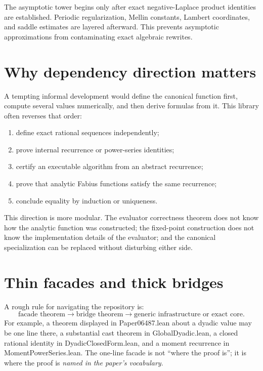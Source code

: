 \documentclass[11pt,a4paper,openany]{book}
\def\module#1{#1.lean}
\newcommand{\module}[1]{\nolinkurl{#1.lean}}
\begin{document}
\begin{dependency}[title={Seam 3: exact products to asymptotics}]
The asymptotic tower begins only after exact negative-Laplace product identities
are established.  Periodic regularization, Mellin constants, Lambert
coordinates, and saddle estimates are layered afterward.  This prevents
asymptotic approximations from contaminating exact algebraic rewrites.
\end{dependency}

\section{Why dependency direction matters}
A tempting informal development would define the canonical function first,
compute several values numerically, and then derive formulas from it.  This
library often reverses that order:
\begin{enumerate}
  \item define exact rational sequences independently;
  \item prove internal recurrence or power-series identities;
  \item certify an executable algorithm from an abstract recurrence;
  \item prove that analytic Fabius functions satisfy the same recurrence;
  \item conclude equality by induction or uniqueness.
\end{enumerate}
This direction is more modular.  The evaluator correctness theorem does not
know how the analytic function was constructed; the fixed-point construction
does not know the implementation details of the evaluator; and the canonical
specialization can be replaced without disturbing either side.

\section{Thin facades and thick bridges}
A rough rule for navigating the repository is:
\[
 \text{facade theorem}\longrightarrow
 \text{bridge theorem}\longrightarrow
 \text{generic infrastructure or exact core}.
\]
For example, a theorem displayed in \module{Paper06487} about a dyadic value
may be one line there, a substantial cast theorem in \module{GlobalDyadic}, a
closed rational identity in \module{DyadicClosedForm}, and a moment recurrence
in \module{MomentPowerSeries}.  The one-line facade is not “where the proof
is”; it is where the proof is \emph{named in the paper's vocabulary}.
\end{document}
